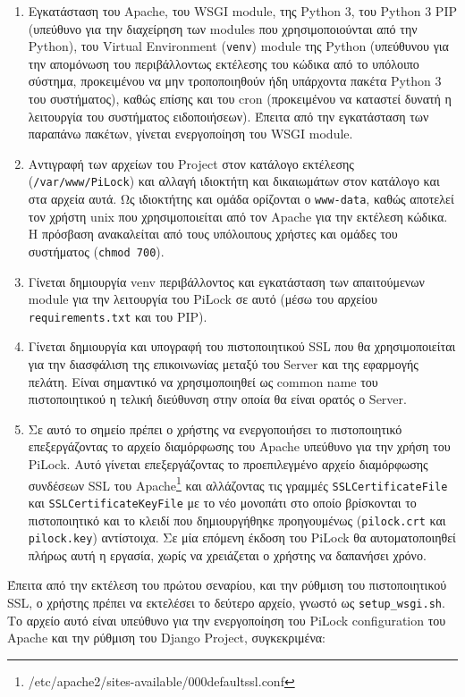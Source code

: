 \begin{enumerate}
	\item Εγκατάσταση του Apache, του WSGI module, της Python 3, του Python 3 PIP (υπεύθυνο για την διαχείρηση των modules που χρησιμοποιούνται από την Python), του Virtual Environment (\verb|venv|) module της Python (υπεύθυνου για την απομόνωση του περιβάλλοντως εκτέλεσης του κώδικα από το υπόλοιπο σύστημα, προκειμένου να μην τροποποιηθούν ήδη υπάρχοντα πακέτα Python 3 του συστήματος), καθώς επίσης και του cron (προκειμένου να καταστεί δυνατή η λειτουργία του συστήματος ειδοποιήσεων). Έπειτα από την εγκατάσταση των παραπάνω πακέτων, γίνεται ενεργοποίηση του WSGI module.
	\item Αντιγραφή των αρχείων του Project στον κατάλογο εκτέλεσης (\verb|/var/www/PiLock|) και αλλαγή ιδιοκτήτη και δικαιωμάτων στον κατάλογο και στα αρχεία αυτά. Ως ιδιοκτήτης και ομάδα ορίζονται ο \verb|www-data|, καθώς αποτελεί τον χρήστη unix που χρησιμοποιείται από τον Apache για την εκτέλεση κώδικα. Η πρόσβαση ανακαλείται από τους υπόλοιπους χρήστες και ομάδες του συστήματος (\verb|chmod 700|).
	\item Γίνεται δημιουργία venv περιβάλλοντος και εγκατάσταση των απαιτούμενων module για την λειτουργία του PiLock σε αυτό (μέσω του αρχείου \verb|requirements.txt| και του PIP).
	\item Γίνεται δημιουργία και υπογραφή του πιστοποιητικού SSL που θα χρησιμοποιείται για την διασφάλιση της επικοινωνίας μεταξύ του Server και της εφαρμογής πελάτη. Είναι σημαντικό να χρησιμοποιηθεί ως common name του πιστοποιητικού η τελική διεύθυνση στην οποία θα είναι ορατός ο Server.
	\item Σε αυτό το σημείο πρέπει ο χρήστης να ενεργοποιήσει το πιστοποιητικό επεξεργάζοντας το αρχείο διαμόρφωσης του Apache υπεύθυνο για την χρήση του PiLock. Αυτό γίνεται επεξεργάζοντας το προεπιλεγμένο αρχείο διαμόρφωσης συνδέσεων SSL του Apache\footnote{/etc/apache2/sites-available/000\-default\-ssl.conf} και αλλάζοντας τις γραμμές \verb|SSLCertificateFile| και \verb|SSLCertificateKeyFile| με το νέο μονοπάτι στο οποίο βρίσκονται το πιστοποιητικό και το κλειδί που δημιουργήθηκε προηγουμένως (\verb|pilock.crt| και \verb|pilock.key|) αντίστοιχα. Σε μία επόμενη έκδοση του PiLock θα αυτοματοποιηθεί πλήρως αυτή η εργασία, χωρίς να χρειάζεται ο χρήστης να δαπανήσει χρόνο.
\end{enumerate}

Έπειτα από την εκτέλεση του πρώτου σεναρίου, και την ρύθμιση του πιστοποιητικού SSL, ο χρήστης πρέπει να εκτελέσει το δεύτερο αρχείο, γνωστό ως \verb|setup_wsgi.sh|. Το αρχείο αυτό είναι υπεύθυνο για την ενεργοποίηση του PiLock configuration του Apache και την ρύθμιση του Django Project, συγκεκριμένα:

